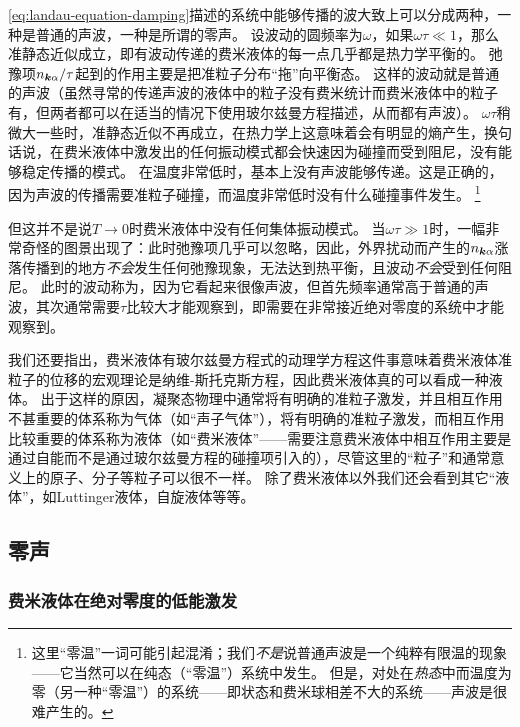 \eqref{eq:landau-equation-damping}描述的系统中能够传播的波大致上可以分成两种，一种是普通的声波，一种是所谓的零声。
设波动的圆频率为$\omega$，如果$\omega \tau \ll 1$，那么准静态近似成立，即有波动传递的费米液体的每一点几乎都是热力学平衡的。
弛豫项$n_{\vb*{k} \alpha} / \tau$起到的作用主要是把准粒子分布“拖”向平衡态。
这样的波动就是普通的声波（虽然寻常的传递声波的液体中的粒子没有费米统计而费米液体中的粒子有，但两者都可以在适当的情况下使用玻尔兹曼方程描述，从而都有声波）。%
$\omega \tau$稍微大一些时，准静态近似不再成立，在热力学上这意味着会有明显的熵产生，换句话说，在费米液体中激发出的任何振动模式都会快速因为碰撞而受到阻尼，没有能够稳定传播的模式。
在温度非常低时，基本上没有声波能够传递。这是正确的，因为声波的传播需要准粒子碰撞，而温度非常低时没有什么碰撞事件发生。%
\footnote{
    这里“零温”一词可能引起混淆；我们\emph{不是}说普通声波是一个纯粹有限温的现象——它当然可以在纯态（“零温”）系统中发生。
    但是，对处在\emph{热态}中而温度为零（另一种“零温”）的系统——即状态和费米球相差不大的系统——声波是很难产生的。
}%

但这并不是说$T \to 0$时费米液体中没有任何集体振动模式。
当$\omega \tau \gg 1$时，一幅非常奇怪的图景出现了：此时弛豫项几乎可以忽略，因此，外界扰动而产生的$n_{\vb*{k} \alpha}$涨落传播到的地方\emph{不会}发生任何弛豫现象，无法达到热平衡，且波动\emph{不会}受到任何阻尼。
此时的波动称为，因为它看起来很像声波，但首先频率通常高于普通的声波，其次通常需要$\tau$比较大才能观察到，即需要在非常接近绝对零度的系统中才能观察到。



我们还要指出，费米液体有玻尔兹曼方程式的动理学方程这件事意味着费米液体准粒子的位移的宏观理论是纳维-斯托克斯方程，因此费米液体真的可以看成一种液体。
出于这样的原因，凝聚态物理中通常将有明确的准粒子激发，并且相互作用不甚重要的体系称为气体（如“声子气体”），将有明确的准粒子激发，而相互作用比较重要的体系称为液体（如“费米液体”——需要注意费米液体中相互作用主要是通过自能而不是通过玻尔兹曼方程的碰撞项引入的），尽管这里的“粒子”和通常意义上的原子、分子等粒子可以很不一样。
除了费米液体以外我们还会看到其它“液体”，如Luttinger液体，自旋液体等等。

\subsection{零声}

\subsubsection{费米液体在绝对零度的低能激发}

